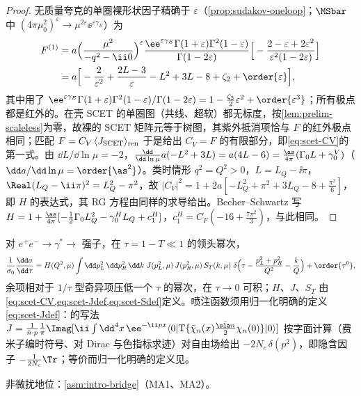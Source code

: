\begin{proof}
无质量夸克的单圈裸形状因子精确于 $\varepsilon$（\cref{prop:sudakov-oneloop}；$\MSbar$ 中 $(4\pi\mu_0^2)^\varepsilon\to\mu^{2\varepsilon}\ee^{\varepsilon\gamma_E}$）为
\[
\begin{aligned}
F^{(1)}&=a\Big(\frac{\mu^2}{-q^2-\ii0}\Big)^{\varepsilon}\frac{\ee^{\varepsilon\gamma_E}\Gamma(1+\varepsilon)\Gamma^2(1-\varepsilon)}{\Gamma(1-2\varepsilon)}\Big[-\frac{2-\varepsilon+2\varepsilon^2}{\varepsilon^2(1-2\varepsilon)}\Big]\\
&=a\Big[-\frac{2}{\varepsilon^2}+\frac{2L-3}{\varepsilon}-L^2+3L-8+\zeta_2+\order{\varepsilon}\Big],
\end{aligned}
\]
其中用了 $\ee^{\varepsilon\gamma_E}\Gamma(1+\varepsilon)\Gamma^2(1-\varepsilon)/\Gamma(1-2\varepsilon)=1-\frac{\zeta_2}{2}\varepsilon^2+\order{\varepsilon^3}$；所有极点都是红外的。在壳 SCET 的单圈图（共线、超软）都无标度，按\cref{lem:prelim-scaleless}为零，故裸的 SCET 矩阵元等于树图，其紫外抵消项恰与 $F$ 的红外极点相同；匹配 $F=C_V\,\langle J_{\rm SCET}\rangle_{\rm ren}$ 于是给出 $C_V=F$ 的有限部分，即\cref{eq:scet-CV}的第一式。由 $\dd L/\dd\ln\mu=-2$，$\frac{\dd}{\dd\ln\mu}a(-L^2+3L)=a(4L-6)=\frac{\as}{4\pi}(\Gamma_0L+\gamma^V_0)$（$\dd a/\dd\ln\mu=\order{\as^2}$）。类时情形 $q^2=Q^2>0$，$L=L_Q-\ii\pi$，$\Real(L_Q-\ii\pi)^2=L_Q^2-\pi^2$，故 $|C_V|^2=1+2a[-L_Q^2+\pi^2+3L_Q-8+\frac{\pi^2}{6}]$，即 $H$ 的表达式，其 RG 方程由同样的求导给出。Becher--Schwartz 写 $H=1+\frac{\as}{4\pi}[-\frac12\Gamma_0L_Q^2-\gamma^H_0L_Q+c^H_1]$，$c^H_1=C_F(-16+\frac{7\pi^2}{3})$，与此相同。
\end{proof}

\begin{theorem}\label{thm:scet-thrust}
对 $e^+e^-\to\gamma^*\to$ 强子，在 $\tau=1-T\ll1$ 的领头幂次，
\begin{equation}\label{eq:scet-thrust-fact}
\frac{1}{\sigma_0}\frac{\dd\sigma}{\dd\tau}=H(Q^2,\mu)\int\dd p_L^2\,\dd p_R^2\,\dd k\;J(p_L^2,\mu)\,J(p_R^2,\mu)\,S_T(k,\mu)\;
\delta\Big(\tau-\frac{p_L^2+p_R^2}{Q^2}-\frac kQ\Big)+\order{\tau^0},
\end{equation}
余项相对于 $1/\tau$ 型奇异项压低一个 $\tau$ 的幂次，在 $\tau\to0$ 可积；$H$、$J$、$S_T$ 由\cref{eq:scet-CV,eq:scet-Jdef,eq:scet-Sdef}定义。喷注函数须用归一化明确的定义\cref{eq:scet-Jdef}：\cite[式~(2.6)]{BecherSchwartz2008}的写法 $J=\frac{1}{\bar n\cdot p}\frac1\pi\Imag[\ii\int\dd^4x\,\ee^{-\ii px}\langle0|\mathrm T\{\bar\chi_n(x)\frac{\bar{\sla n}}2\chi_n(0)\}|0\rangle]$ 按字面计算（费米子编时符号、对 Dirac 与色指标求迹）对自由场给出 $-2N_c\,\delta(p^2)$，即隐含因子 $-\frac1{2N_c}\Tr$；等价而归一化明确的定义见\cite[式~(3)、(6)]{Becher:2006qw}。%
\par 非微扰地位：\cref{asm:intro-bridge}（MA1、MA2）。
\end{theorem}

